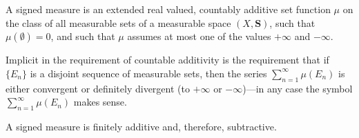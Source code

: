 A signed measure is an extended real valued, countably additive set function $\mu$ on the class of all measurable sets of a measurable space $(X, \mathbf{S})$, such that $\mu(\emptyset) = 0$, and such that $\mu$ assumes at most one of the values $+\infty$ and $-\infty$.

Implicit in the requirement of countable additivity is the requirement that if $\{E_n\}$ is a disjoint sequence of measurable sets, then the series $\sum_{n=1}^{\infty} \mu(E_n)$ is either convergent or definitely divergent (to $+\infty$ or $-\infty$)---in any case the symbol $\sum_{n=1}^{\infty} \mu(E_n)$ makes sense.

A signed measure is finitely additive and, therefore, subtractive.
